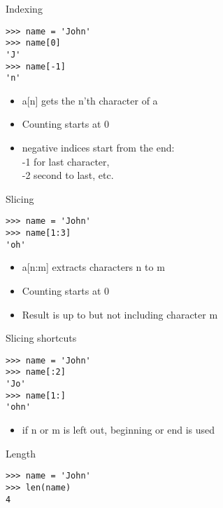 \documentclass{beamer}
\begin{document}
\begin{frame}[fragile]{Indexing}
\begin{lstlisting}
>>> name = 'John'
>>> name[0]
'J'
>>> name[-1]
'n'
\end{lstlisting}
    \begin{itemize}
        \item a[n] gets the n'th character of a
        \item Counting starts at 0
        \item negative indices start from the end:\\
			-1 for last character, \\
            -2 second to last, etc.
    \end{itemize}
\end{frame}

\begin{frame}[fragile]{Slicing}
\begin{lstlisting}
>>> name = 'John'
>>> name[1:3]
'oh'
\end{lstlisting}
    \begin{itemize}
        \item a[n:m] extracts characters n to m
        \item Counting starts at 0
        \item Result is up to but not including character m
    \end{itemize}
\end{frame}

\begin{frame}[fragile]{Slicing shortcuts}
\begin{lstlisting}
>>> name = 'John'
>>> name[:2]
'Jo'
>>> name[1:]
'ohn'
\end{lstlisting}
    \begin{itemize}
        \item if n or m is left out, beginning or end is used
    \end{itemize}
\end{frame}

\begin{frame}[fragile]{Length}
\begin{lstlisting}
>>> name = 'John'
>>> len(name)
4
\end{lstlisting}
\end{frame}
\end{document}
